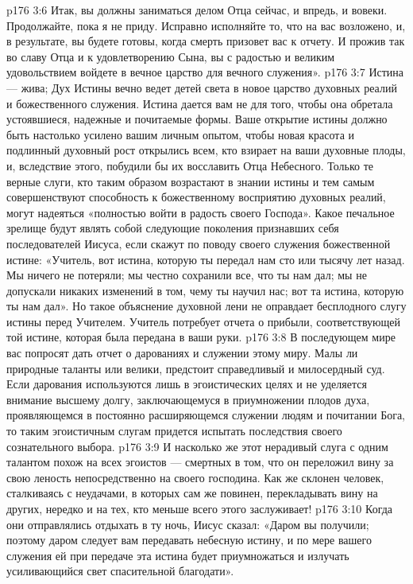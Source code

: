 \vs p176 3:6 Итак, вы должны заниматься делом Отца сейчас, и впредь, и вовеки. Продолжайте, пока я не приду. Исправно исполняйте то, что на вас возложено, и, в результате, вы будете готовы, когда смерть призовет вас к отчету. И прожив так во славу Отца и к удовлетворению Сына, вы с радостью и великим удовольствием войдете в вечное царство для вечного служения».
\vs p176 3:7 \pc Истина --- жива; Дух Истины вечно ведет детей света в новое царство духовных реалий и божественного служения. Истина дается вам не для того, чтобы она обретала устоявшиеся, надежные и почитаемые формы. Ваше открытие истины должно быть настолько усилено вашим личным опытом, чтобы новая красота и подлинный духовный рост открылись всем, кто взирает на ваши духовные плоды, и, вследствие этого, побудили бы их восславить Отца Небесного. Только те верные слуги, кто таким образом возрастают в знании истины и тем самым совершенствуют способность к божественному восприятию духовных реалий, могут надеяться «полностью войти в радость своего Господа». Какое печальное зрелище будут являть собой следующие поколения признавших себя последователей Иисуса, если скажут по поводу своего служения божественной истине: «Учитель, вот истина, которую ты передал нам сто или тысячу лет назад. Мы ничего не потеряли; мы честно сохранили все, что ты нам дал; мы не допускали никаких изменений в том, чему ты научил нас; вот та истина, которую ты нам дал». Но такое объяснение духовной лени не оправдает бесплодного слугу истины перед Учителем. Учитель потребует отчета о прибыли, соответствующей той истине, которая была передана в ваши руки.
\vs p176 3:8 В последующем мире вас попросят дать отчет о дарованиях и служении этому миру. Малы ли природные таланты или велики, предстоит справедливый и милосердный суд. Если дарования используются лишь в эгоистических целях и не уделяется внимание высшему долгу, заключающемуся в приумножении плодов духа, проявляющемся в постоянно расширяющемся служении людям и почитании Бога, то таким эгоистичным слугам придется испытать последствия своего сознательного выбора.
\vs p176 3:9 И насколько же этот нерадивый слуга с одним талантом похож на всех эгоистов --- смертных в том, что он переложил вину за свою леность непосредственно на своего господина. Как же склонен человек, сталкиваясь с неудачами, в которых сам же повинен, перекладывать вину на других, нередко и на тех, кто меньше всего этого заслуживает!
\vs p176 3:10 Когда они отправлялись отдыхать в ту ночь, Иисус сказал: «Даром вы получили; поэтому даром следует вам передавать небесную истину, и по мере вашего служения ей при передаче эта истина будет приумножаться и излучать усиливающийся свет спасительной благодати».

